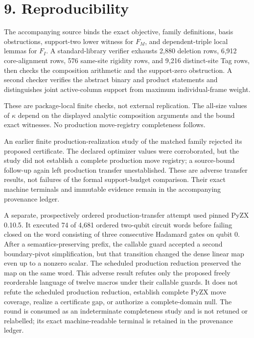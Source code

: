 \documentclass[11pt]{article}
\begin{document}
\hypertarget{reproducibility}{%
\section*{9. Reproducibility}\label{reproducibility}}

The accompanying source binds the exact objective, family definitions, basis obstructions, support-two lower witness for \(F_M\), and dependent-triple local lemmas for \(F_I\). A standard-library verifier exhausts 2,880 deletion rows, 6,912 core-alignment rows, 576 same-site rigidity rows, and 9,216 distinct-site Tag rows, then checks the composition arithmetic and the support-zero obstruction. A second checker verifies the abstract binary and product statements and distinguishes joint active-column support from maximum individual-frame weight.

These are package-local finite checks, not external replication. The all-size values of \(\kappa\) depend on the displayed analytic composition arguments and the bound exact witnesses. No production move-registry completeness follows.

An earlier finite production-realization study of the matched family rejected its proposed certificate. The declared optimizer values were corroborated, but the study did not establish a complete production move registry; a source-bound follow-up again left production transfer unestablished. These are adverse transfer results, not failures of the formal support-budget comparison. Their exact machine terminals and immutable evidence remain in the accompanying provenance ledger.

A separate, prospectively ordered production-transfer attempt used pinned PyZX 0.10.5. It executed 74 of 4,681 ordered two-qubit circuit words before failing closed on the word consisting of three consecutive Hadamard gates on qubit 0. After a semantics-preserving prefix, the callable guard accepted a second boundary-pivot simplification, but that transition changed the dense linear map even up to a nonzero scalar. The scheduled production reduction preserved the map on the same word. This adverse result refutes only the proposed freely reorderable language of twelve macros under their callable guards. It does not refute the scheduled production reduction, establish complete PyZX move coverage, realize a certificate gap, or authorize a complete-domain null. The round is consumed as an indeterminate completeness study and is not retuned or relabelled; its exact machine-readable terminal is retained in the provenance ledger.
\end{document}
